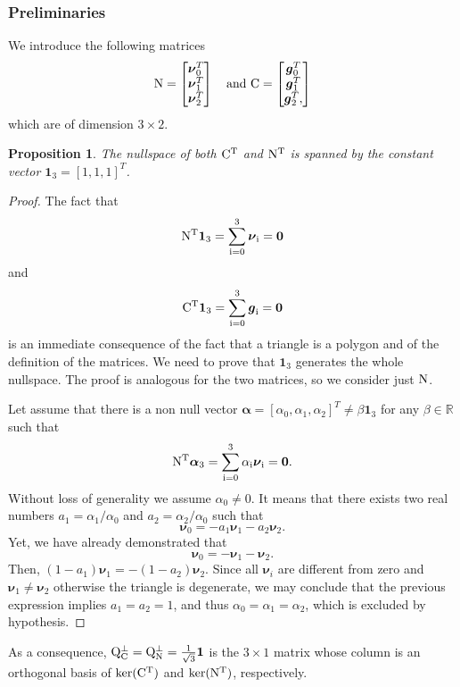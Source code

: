 \documentclass[11pt,a4paper,twoside]{article}
\newcommand{\normalarea}{\ensuremath{\boldsymbol{\nu}}}
\newcommand{\N}{\ensuremath{\rm N}}
\newcommand{\C}{\ensuremath{\rm C}}
\newcommand{\QC}{\ensuremath{\rm Q}_C^{\perp}}
\newcommand{\QN}{\ensuremath{\rm Q}_N^{\perp}}
\newcommand{\cvect}{\ensuremath{\boldsymbol{g}}}
\newtheorem{prop}{Proposition}
\begin{document}
\subsubsection{Preliminaries}
We introduce the following matrices
\begin{equation}
\label{eq:normalarea}
\N=\begin{bmatrix}
\normalarea_0^T\\\normalarea_1^T\\\normalarea_2^T
\end{bmatrix}
\quad \text{and }
\C=\begin{bmatrix}
\cvect_0^T\\\cvect_1^T\\\cvect_2^T,
\end{bmatrix}
\end{equation}
which are of dimension $3\times 2$.
\begin{prop}
The nullspace of both $\C^T$ and $\N^T$ is spanned by the constant vector
$\boldsymbol{1}_3=[1,1,1]^T$.
\end{prop}
\begin{proof}
The fact that 
\[
\N^T\boldsymbol{1}_3=\sum_{i=0}^3\normalarea_i=\boldsymbol{0}
\]
 and 
\[
\C^T\boldsymbol{1}_3=\sum_{i=0}^3\cvect_i=\boldsymbol{0}
\] 
is an immediate consequence of the fact that a triangle is a polygon and of the definition of the matrices.
 We need to prove that $\boldsymbol{1}_3$ generates the whole nullspace.
 The proof is analogous for the two matrices, so we consider just $\N$.

 Let assume that there is a non null vector $\boldsymbol{\alpha}=[\alpha_0,\alpha_1,\alpha_2]^T\ne \beta\boldsymbol{1}_3$
for any $\beta\in\mathbb{R}$ such that
\[
\N^T\boldsymbol{\alpha}_3=\sum_{i=0}^3\alpha_i\normalarea_i=\boldsymbol{0}.
\]
Without loss of generality we assume $\alpha_0\ne 0$. It means
that there exists two real numbers $a_1=\alpha_1/\alpha_0$ and $a_2=\alpha_2/\alpha_0$ such that
\[
\normalarea_0=-a_1 \normalarea_1 - a_2 \normalarea_2.
\]
Yet, we have already demonstrated that
\[
\normalarea_0=-\normalarea_1 -\normalarea_2.
\]
Then, $ (1-a_1)\normalarea_1=-(1-a_2)\normalarea_2$. Since all
$\normalarea_i$ are different from zero and
$\normalarea_1\ne\normalarea_2$ otherwise the triangle is degenerate,
we may conclude that the previous expression implies $a_1=a_2=1$, and
thus $\alpha_0=\alpha_1=\alpha_2$, which is excluded by hypothesis.
\end{proof}

As a consequence, $\QC=\QN=\frac{1}{\sqrt{3}}\boldsymbol{1}$ is the
$3\times 1$ matrix whose column is an orthogonal basis of
$\operatorname{ker}(\C^T)$ and $\operatorname{ker}(\N^T)$, respectively.
\end{document}
